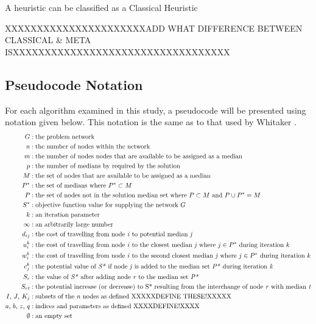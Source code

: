 \documentclass[11pt]{article}
\begin{document}
	A heuristic can be classified as a Classical Heuristic 
	
	
	XXXXXXXXXXXXXXXXXXXXXXADD WHAT DIFFERENCE BETWEEN CLASSICAL \& META ISXXXXXXXXXXXXXXXXXXXXXXXXXXXXXXXXXX
	
	\subsection{Pseudocode Notation}
	For each algorithm examined in this study, a pseudocode will be presented using notation given below.  This notation is the same as to that used by Whitaker \cite{WHIT83}.
	\begin{align*}
	G &: \text{the problem network}\\
	n &: \text{the number of nodes within the network}\\
	m &: \text{the number of nodes nodes that are available to be assigned as a median}\\
	p &: \text{the number of medians by required by the solution}\\
	M &: \text{the set of nodes that are available to be assigned as a median}\\
	P^{*} &: \text{the set of medians where } P^{*} \subset M\\
	P &: \text{the set of nodes not in the solution median set where } P \subset M \text{ and } P \cup P^{*} = M\\
	S^{*} &: \text{objective function value for supplying the network } G\\
	k &: \text{an iteration parameter}\\
	\infty &: \text{an arbitrarily large number}\\
	d_{ij} &: \text{the cost of travelling from node \emph{i} to potential median \emph{j}}\\
	u_{i}^{k} &: \text{the cost of travelling from node \emph{i} to the closest median \emph{j} where } j \in P^{*} \text{ during iteration } k\\
	w_{i}^{k} &: \text{the cost of travelling from node \emph{i} to the second closest median \emph{j} where } j \in P^{*} \text{ during iteration } k\\
	c_{j}^{k} &: \text{the potential value of \emph{S*} if node \emph{j} is added to the median set \emph{P*} during iteration \emph{k}}\\
	S_{r} &: \text{the value of \emph{S*} after adding node \emph{r} to the median set \emph{P*}}\\
	S_{rt} &: \text{the potential increase (or decrease) to S* resulting from the interchange of node \emph{r} with median \emph{t}}\\
	I \text{, } J \text{, } K_{j} &: \text{subsets of the \emph{n} nodes as defined XXXXXDEFINE THESE!XXXXX}\\
	a \text{, } b \text{, } z \text{, } q &: \text{indices and parameters as defined XXXXDEFINE!XXXX}\\
	\emptyset &: \text{an empty set}	
	\end{align*}
	
\end{document}
